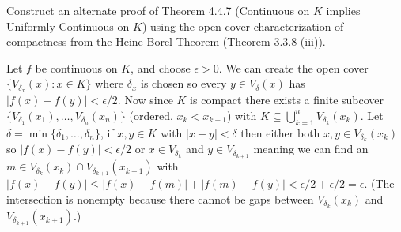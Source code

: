 \begin{exercise}
  Construct an alternate proof of Theorem 4.4.7 (Continuous on $K$ implies Uniformly Continuous on $K$) using the open cover characterization of compactness from the Heine-Borel Theorem (Theorem 3.3.8 (iii)).
\end{exercise}

\begin{solution}
  Let $f$ be continuous on $K$, and choose $\epsilon > 0$. We can create the open cover $\{V_{\delta_x}(x) : x \in K\}$ where $\delta_x$ is chosen so every $y \in V_\delta(x)$ has $|f(x)-f(y)|<\epsilon/2$.
  Now since $K$ is compact there exists a finite subcover $\{V_{\delta_1}(x_1), \dots, V_{\delta_n}(x_n)\}$ (ordered, $x_k < x_{k+1}$) with $K \subseteq \bigcup_{k=1}^n V_{\delta_k}(x_k)$. Let $\delta = \min\{\delta_1, \dots, \delta_n\}$, if $x,y \in  K$ with $|x-y| < \delta$ then either both $x,y \in V_{\delta_k}(x_k)$ so $|f(x)-f(y)|<\epsilon/2$ or
  $x \in V_{\delta_k}$ and $y \in V_{\delta_{k+1}}$ meaning we can find an $m \in V_{\delta_k}(x_k) \cap V_{\delta_{k+1}}(x_{k+1})$ with $|f(x)-f(y)|\le |f(x)-f(m)|+|f(m)-f(y)|<\epsilon/2+\epsilon/2=\epsilon$. (The intersection is nonempty because there cannot be gaps between $V_{\delta_k}(x_k)$ and $V_{\delta_{k+1}}(x_{k+1})$.)
\end{solution}
